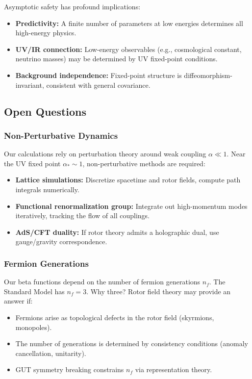 \documentclass[11pt,a4paper]{article}
\numberwithin{equation}{section}
\theoremstyle{plain}
\theoremstyle{definition}
\theoremstyle{remark}
\begin{document}
Asymptotic safety has profound implications:
\begin{itemize}
  \item \textbf{Predictivity:} A finite number of parameters at low energies determines all high-energy physics.
  \item \textbf{UV/IR connection:} Low-energy observables (e.g., cosmological constant, neutrino masses) may be determined by UV fixed-point conditions.
  \item \textbf{Background independence:} Fixed-point structure is diffeomorphism-invariant, consistent with general covariance.
\end{itemize}

\subsection{Open Questions}

\subsubsection{Non-Perturbative Dynamics}

Our calculations rely on perturbation theory around weak coupling $\alpha\ll 1$. Near the UV fixed point $\alpha_*\sim 1$, non-perturbative methods are required:
\begin{itemize}
  \item \textbf{Lattice simulations:} Discretize spacetime and rotor fields, compute path integrals numerically.
  \item \textbf{Functional renormalization group:} Integrate out high-momentum modes iteratively, tracking the flow of all couplings.
  \item \textbf{AdS/CFT duality:} If rotor theory admits a holographic dual, use gauge/gravity correspondence.
\end{itemize}

\subsubsection{Fermion Generations}

Our beta functions depend on the number of fermion generations $n_f$. The Standard Model has $n_f=3$. Why three? Rotor field theory may provide an answer if:
\begin{itemize}
  \item Fermions arise as topological defects in the rotor field (skyrmions, monopoles).
  \item The number of generations is determined by consistency conditions (anomaly cancellation, unitarity).
  \item GUT symmetry breaking constrains $n_f$ via representation theory.
\end{itemize}
\end{document}
